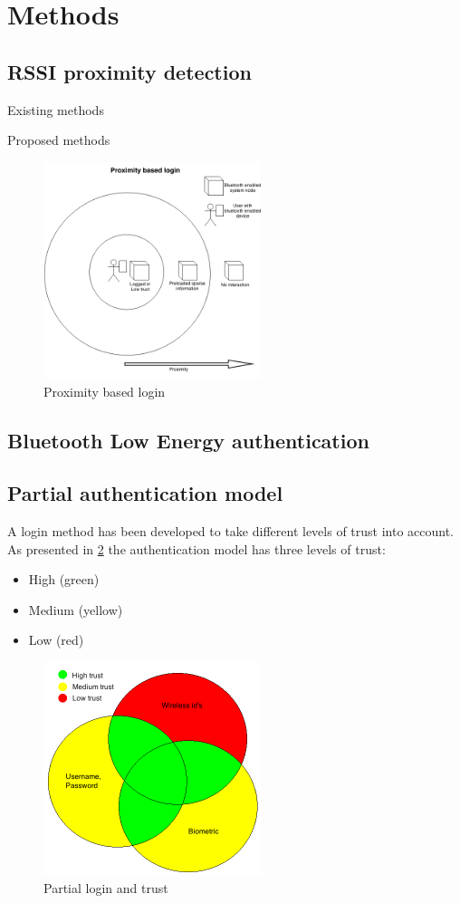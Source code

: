 \section{Methods}

\subsection{RSSI proximity detection}

Existing methods

Proposed methods

\begin{figure}[!t]
	\centering
	\includegraphics[width=2.5in]{img/proximityBasedLogin}
	\caption{ Proximity based login }
	\label{fig_proximity_based_login}
\end{figure}

\subsection{Bluetooth Low Energy authentication}

\subsection{Partial authentication model}
A login method has been developed to take different levels of trust into account.
As presented in \cref{fig_authentication_model} the authentication model has three levels of trust:

\begin{itemize}
\item High (green)
\item Medium (yellow)
\item Low (red)
\end{itemize}

\begin{figure}[!t]
	\centering
	\includegraphics[width=2.5in]{img/authenticationModel}
	\caption{ Partial login and trust }
	\label{fig_authentication_model}
\end{figure}

